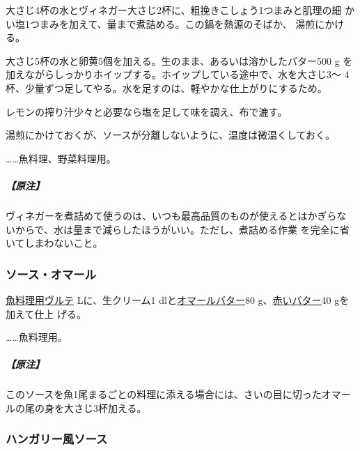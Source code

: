 \begin{recette}
大さじ4杯の水とヴィネガー大さじ2杯に、粗挽きこしょう1つまみと肌理の細
かい塩1つまみを加えて、\untiers{}量まで煮詰める。この鍋を熱源のそばか、
湯煎にかける。

大さじ5杯の水と卵黄5個を加える。生のまま、あるいは溶かしたバター500 g
を加えながらしっかりホイップする。ホイップしている途中で、水を大さじ3〜
4杯、少量ずつ足してやる。水を足すのは、軽やかな仕上がりにするため。

レモンの搾り汁少々と必要なら塩を足して味を調え、布で漉す。

湯煎にかけておくが、ソースが分離しないように、温度は微温くしておく。

\ldots{}\ldots{}魚料理、野菜料理用。

\hypertarget{nota-sauce-hollandaise}{%
\subparagraph{【原注】}\label{nota-sauce-hollandaise}}

ヴィネガーを煮詰めて使うのは、いつも最高品質のものが使えるとはかぎらな
いからで、水は\untiers{}量まで減らしたほうがいい。ただし、煮詰める作業
を完全に省いてしまわないこと。

\maeaki

\hypertarget{sauce-homard}{%
\subsubsection{ソース・オマール}\label{sauce-homard}}



\protect\hyperlink{veloute-de-poisson}{魚料理用ヴルテ}\troisquarts{}
Lに、生クリーム1 \undemi{} dlと\protect\hyperlink{}{オマールバター}80
g、\protect\hyperlink{}{赤いバター}40 gを加えて仕上 げる。

\ldots{}\ldots{}魚料理用。

\hypertarget{ux539fux6ce8-5}{%
\subparagraph{【原注】}\label{ux539fux6ce8-5}}

このソースを魚1尾まるごとの料理に添える場合には、さいの目に切ったオマー
ルの尾の身を大さじ3杯加える。

\maeaki

\hypertarget{sauce-hongroise}{%
\subsubsection{ハンガリー風ソース}\label{sauce-hongroise}}


\end{recette}

